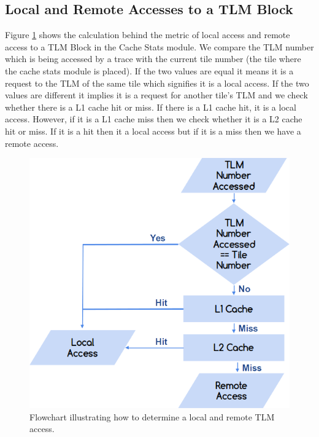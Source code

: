 \documentclass{listhesis}
\begin{document}
\subsection{Local and Remote Accesses to a TLM Block}
Figure \ref{fig:remoteLocalAccess} shows the calculation behind the metric of local access and remote access to a TLM Block in the Cache Stats module. We compare the TLM number which is being accessed by a trace with the current tile number (the tile where the cache stats module is placed). If the two values are equal it means it is a request to the TLM of the same tile which signifies it is a local access. If the two values are different it implies it is a request for another tile's TLM and we check whether there is a L1 cache hit or miss. If there is a L1 cache hit, it is a local access. However, if it is a L1 cache miss then we check whether it is a L2 cache hit or miss. If it is a hit then it a local access but if it is a miss then we have a remote access. \\
\begin{figure}
  \includegraphics[width=0.6\linewidth]{localandremote.png}
  \centering
  \caption{Flowchart illustrating how to determine a local and remote TLM access.}
  \label{fig:remoteLocalAccess}
\end{figure}
\end{document}
